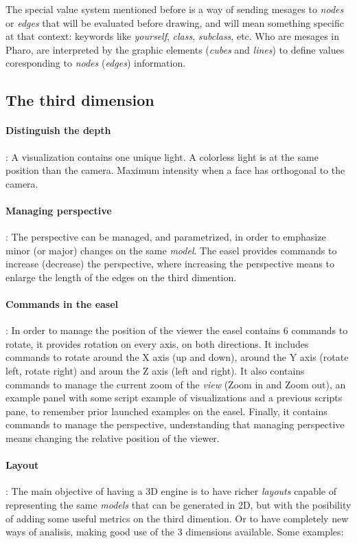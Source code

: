 \documentclass{sig-alternate}
\newcommand{\seclabel}[1]{\label{sec:#1}}
\begin{document}
The special value system mentioned before is a way of sending
mesages to \emph{nodes} or \emph{edges} that will be evaluated
before drawing, and will mean something specific at that context:
keywords like \emph{yourself}, \emph{class}, \emph{subclass}, etc.
Who are mesages in Pharo, are interpreted by the graphic
elements (\emph{cubes} and \emph{lines}) to define values
coresponding to \emph{nodes} (\emph{edges}) information. 
\subsection{The third dimension} \seclabel{3d}

\paragraph{Distinguish the depth}: 
A visualization contains one unique light. 
A colorless light is at the same position than the camera. 
Maximum intensity when a face has orthogonal to the camera.

\paragraph{Managing perspective}:
The perspective can be managed, and parametrized,
in order to emphasize minor (or major) changes on the same
\emph{model}. The easel provides commands to increase 
(decrease) the perspective, where increasing the
perspective means to enlarge the length of the edges on the
third dimention. 

\paragraph{Commands in the easel}: 
In order to manage the position of the viewer the easel 
contains 6 commands to rotate, it provides rotation on 
every axis, on both directions. It includes commands
to rotate around the X axis (up and down), around the
Y axis (rotate left, rotate right) and aroun the Z axis
(left and right). It also contains commands to manage
the current zoom of the \emph{view} (Zoom in and Zoom out),
an example panel with some script example of visualizations
and a previous scripts pane, to remember prior launched examples
on the easel. Finally, it contains commands to manage the 
perspective, understanding that managing perspective means
changing the relative position of the viewer.  
   

\paragraph{Layout}:
The main objective of having a 3D engine is to have richer 
\emph{layouts} capable of representing the same \emph{models} 
that can be generated in 2D, but with the posibility of adding 
some useful metrics on the third dimention. Or to have 
completely new ways of analisis, making good use of the 3 
dimensions available.
Some examples:
\end{document}
